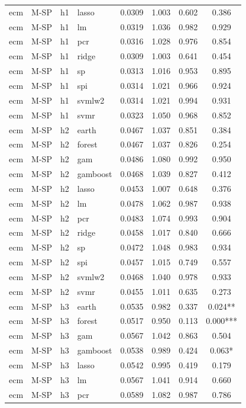 \begin{ThreePartTable}
\begin{longtable}[t]{llclcccc}
ecm & M-SP & h1 & lasso & 0.0309 & 1.003 & 0.602 & 0.386\\
ecm & M-SP & h1 & lm & 0.0319 & 1.036 & 0.982 & 0.929\\
ecm & M-SP & h1 & pcr & 0.0316 & 1.028 & 0.976 & 0.854\\
ecm & M-SP & h1 & ridge & 0.0309 & 1.003 & 0.641 & 0.454\\
ecm & M-SP & h1 & sp & 0.0313 & 1.016 & 0.953 & 0.895\\
ecm & M-SP & h1 & spi & 0.0314 & 1.021 & 0.966 & 0.924\\
ecm & M-SP & h1 & svmlw2 & 0.0314 & 1.021 & 0.994 & 0.931\\
ecm & M-SP & h1 & svmr & 0.0323 & 1.050 & 0.968 & 0.852\\
\addlinespace
ecm & M-SP & h2 & earth & 0.0467 & 1.037 & 0.851 & 0.384\\
ecm & M-SP & h2 & forest & 0.0467 & 1.037 & 0.826 & 0.254\\
ecm & M-SP & h2 & gam & 0.0486 & 1.080 & 0.992 & 0.950\\
ecm & M-SP & h2 & gamboost & 0.0468 & 1.039 & 0.827 & 0.412\\
ecm & M-SP & h2 & lasso & 0.0453 & 1.007 & 0.648 & 0.376\\
ecm & M-SP & h2 & lm & 0.0478 & 1.062 & 0.987 & 0.938\\
ecm & M-SP & h2 & pcr & 0.0483 & 1.074 & 0.993 & 0.904\\
ecm & M-SP & h2 & ridge & 0.0458 & 1.017 & 0.840 & 0.666\\
ecm & M-SP & h2 & sp & 0.0472 & 1.048 & 0.983 & 0.934\\
ecm & M-SP & h2 & spi & 0.0457 & 1.015 & 0.749 & 0.557\\
ecm & M-SP & h2 & svmlw2 & 0.0468 & 1.040 & 0.978 & 0.933\\
ecm & M-SP & h2 & svmr & 0.0455 & 1.011 & 0.635 & 0.273\\
\addlinespace
ecm & M-SP & h3 & earth & 0.0535 & 0.982 & 0.337 & 0.024**\\
ecm & M-SP & h3 & forest & 0.0517 & 0.950 & 0.113 & 0.000***\\
ecm & M-SP & h3 & gam & 0.0567 & 1.042 & 0.863 & 0.504\\
ecm & M-SP & h3 & gamboost & 0.0538 & 0.989 & 0.424 & 0.063*\\
ecm & M-SP & h3 & lasso & 0.0542 & 0.995 & 0.419 & 0.179\\
ecm & M-SP & h3 & lm & 0.0567 & 1.041 & 0.914 & 0.660\\
ecm & M-SP & h3 & pcr & 0.0589 & 1.082 & 0.987 & 0.786\\

\end{longtable}
\end{ThreePartTable}
